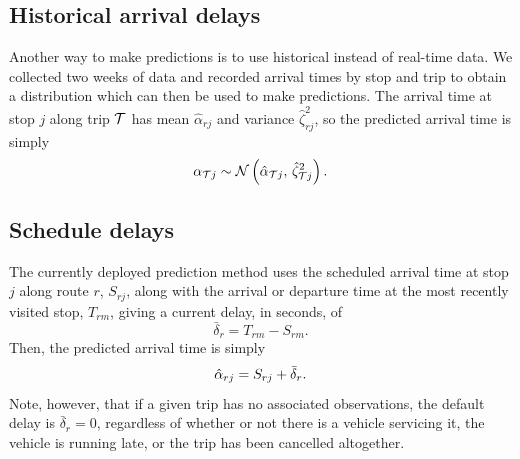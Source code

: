 \subsection{Historical arrival delays}
\label{eq:prediction_arrival_historical}

Another way to make predictions is to use historical instead of real-time data. We collected two weeks of data and recorded arrival times by stop and trip to obtain a distribution which can then be used to make predictions. The arrival time at stop $j$ along trip $\mathcal{T}$ has mean $\hat\alpha_{rj}$ and variance $\hat\zeta_{rj}^2$, so the predicted arrival time is simply
\begin{equation}
\label{eq:arrival_pred_historical}
\alpha_{\mathcal{T} j} \sim \mathcal{N}\left(\hat\alpha_{\mathcal{T} j},\, \hat\zeta_{\mathcal{T} j}^2\right).
\end{equation}


\subsection{Schedule delays}
\label{eq:prediction_arrival_sched_delay}

The currently deployed prediction method uses the scheduled arrival time at stop $j$ along route $r$, $S_{rj}$, along with the arrival or departure time at the most recently visited stop, $T_{rm}$, giving a current delay, in seconds, of
\begin{equation}
\label{eq:sched_cur_delay}
\bar\delta_{r} = T_{rm} - S_{rm}.
\end{equation}
Then, the predicted arrival time is simply
\begin{equation}
\label{eq:sched_pred_arr}
\hat{\alpha}_{rj} = S_{rj} + \bar\delta_r.
\end{equation}
Note, however, that if a given trip has no associated observations, the default delay is $\bar\delta_r = 0$, regardless of whether or not there is a vehicle servicing it, the vehicle is running late, or the trip has been cancelled altogether.
